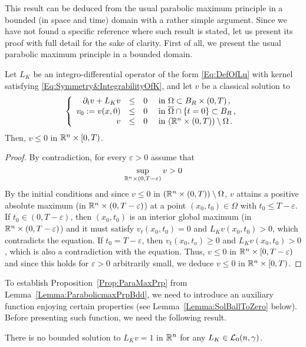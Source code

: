 This result can be deduced from the usual parabolic maximum principle in a bounded (in space and time) domain with a rather simple argument. Since we have not found a specific reference where such result is stated, let us present its proof with full detail for the sake of clarity. First of all, we present the usual parabolic maximum principle in a bounded domain.

\begin{lemma}
\label{Lemma:ParabolicmaxPrpBdd}
Let $L_K$ be an integro-differential operator of the form \eqref{Eq:DefOfLu} with kernel satisfying \eqref{Eq:Symmetry&IntegrabilityOfK}, and let $v$ be a classical solution to
\begin{equation*}
\left\{\begin{array}{rcll}
\partial_t v + L_K v &\leq& 0 & \textrm{ in } \Omega \subset B_R\times(0,T)\,,\\
v_0:=v(x,0) &\leq& 0 & \textrm{ in } \overline{\Omega} \cap \{t=0\} \subset B_R\,,\\
v &\leq& 0 & \textrm{ in } ( \mathbb{R}^n \times (0,T))\setminus \Omega \,.
\end{array} \right.
\end{equation*}
Then, $v\leq 0$ in $\mathbb{R}^n\times [0,T)$.
\end{lemma}

\begin{proof}
By contradiction, for every $\varepsilon > 0$ assume that 
$$
\sup_{\mathbb{R}^n \times (0,T-\varepsilon)}v > 0
$$
By the initial conditions and since $v \leq 0 $ in $(\mathbb{R}^n \times (0,T))\setminus \Omega$, $v$  attains a positive absolute maximum (in $\mathbb{R}^n \times (0,T-\varepsilon)$) at a point $(x_0,t_0) \in \Omega$ with $t_0\leq T-\varepsilon$. If $t_0\in(0,T-\varepsilon)$, then $(x_0,t_0)$ is an interior global maximum (in $\mathbb{R}^n \times (0,T-\varepsilon)$) and it must satisfy $v_t(x_0,t_0)=0$ and $L_K v(x_0,t_0)>0$, which contradicts the equation. If $t_0 = T-\varepsilon$, then $v_t(x_0,t_o)\geq 0$ and $L_K v(x_0,t_0)>0$, which is also a contradiction with the equation. Thus, $v\leq 0$ in $\mathbb{R}^n\times [0,T-\varepsilon)$ and since this holds for $\varepsilon>0$ arbitrarily small, we deduce $v\leq 0$ in $\mathbb{R}^n\times [0,T)$.
\end{proof}

To establish Proposition~\ref{Prop:ParaMaxPrp} from Lemma~\ref{Lemma:ParabolicmaxPrpBdd}, we need to introduce an auxiliary function enjoying certain properties (see Lemma~\ref{Lemma:SolBallToZero} below). Before presenting such function, we need the following result.

\begin{lemma}
\label{Lemma:NoBddSolL=1}
There is no bounded solution to $L_K v=1$ in $\mathbb{R}^n$ for any $L_K \in \mathcal{L}_0(n,\gamma)$.
\end{lemma}

